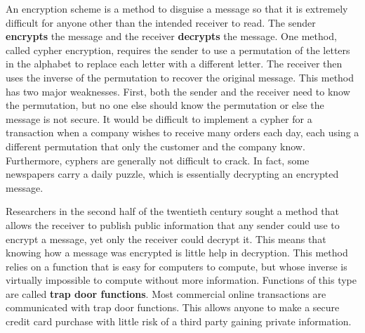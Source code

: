 \documentclass[11pt,oneside]{article}
\begin{document}
\fi
\renewcommand{\BookFooter}{Section 25 Encryption}
\ifdefined\BookMaster\else\setcounter{page}{205}\fi
\BookNarrativetrue

\begin{BookBody}


\noindent An encryption scheme is a method to disguise a message so that it is extremely difficult for anyone other than the intended receiver to read. The sender\textbf{ encrypts} the message and the receiver\textbf{ decrypts} the message. One method, called cypher encryption, requires the sender to use a permutation of the letters in the alphabet to replace each letter with a different letter. The receiver then uses the inverse of the permutation to recover the original message. This method has two major weaknesses. First, both the sender and the receiver need to know the permutation, but no one else should know the permutation or else the message is not secure. It would be difficult to implement a cypher for a transaction when a company wishes to receive many orders each day, each using a different permutation that only the customer and the company know. Furthermore, cyphers are generally not difficult to crack. In fact, some newspapers carry a daily puzzle, which is essentially decrypting an encrypted message.

Researchers in the second half of the twentieth century sought a method that allows the receiver to publish public information that any sender could use to encrypt a message, yet only the receiver could decrypt it. This means that knowing how a message was encrypted is little help in decryption. This method relies on a function that is easy for computers to compute, but whose inverse is virtually impossible to compute without 
more information. Functions of this type are called\textbf{ trap door functions}. Most commercial online transactions are communicated with trap door functions. This allows anyone to make a secure credit card purchase with little risk of a third party gaining private information.

\end{BookBody}

\BookNarrativetrue
\end{document}

